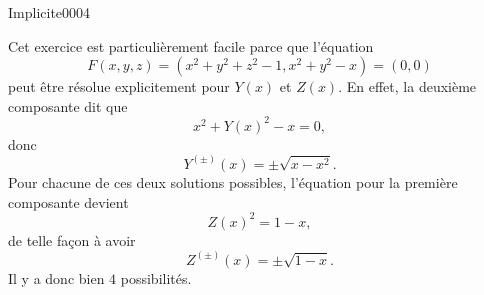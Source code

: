 
\begin{corrige}{Implicite0004}

	Cet exercice est particulièrement facile parce que l'équation
	\begin{equation}
		F(x,y,z)=(x^2+y^2+z^2-1,x^2+y^2-x)=(0,0)
	\end{equation}
	peut être résolue explicitement pour $Y(x)$ et $Z(x)$. En effet, la deuxième composante dit que
	\begin{equation}
		x^2+Y(x)^2-x=0,
	\end{equation}
	donc
	\begin{equation}
		Y^{(\pm)}(x)=\pm\sqrt{x-x^2}.
	\end{equation}
	Pour chacune de ces deux solutions possibles, l'équation pour la première composante devient
	\begin{equation}
		Z(x)^2=1-x,
	\end{equation}
    de telle façon à avoir
	\begin{equation}
		Z^{(\pm)}(x)=\pm\sqrt{1-x}.
	\end{equation}
	Il y a donc bien $4$ possibilités.

\end{corrige}
